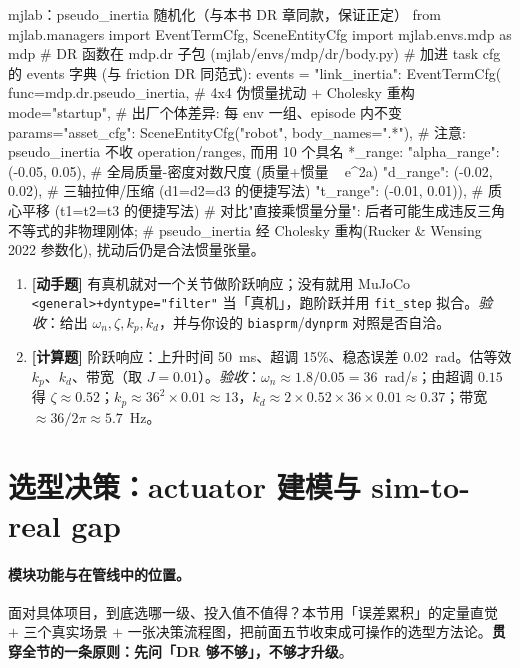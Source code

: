 \begin{codebox}[Python]{mjlab：pseudo\_inertia 随机化（与本书 DR 章同款，保证正定）}
from mjlab.managers import EventTermCfg, SceneEntityCfg
import mjlab.envs.mdp as mdp        # DR 函数在 mdp.dr 子包 (mjlab/envs/mdp/dr/body.py)
# 加进 task cfg 的 events 字典 (与 friction DR 同范式):
events = {
    "link_inertia": EventTermCfg(
        func=mdp.dr.pseudo_inertia,            # 4x4 伪惯量扰动 + Cholesky 重构
        mode="startup",                        # 出厂个体差异: 每 env 一组、episode 内不变
        params={"asset_cfg": SceneEntityCfg("robot", body_names=".*"),
                # 注意: pseudo_inertia 不收 operation/ranges, 而用 10 个具名 *_range:
                "alpha_range": (-0.05, 0.05),  # 全局质量-密度对数尺度 (质量+惯量 ~ e^{2a})
                "d_range": (-0.02, 0.02),      # 三轴拉伸/压缩 (d1=d2=d3 的便捷写法)
                "t_range": (-0.01, 0.01)}),    # 质心平移 (t1=t2=t3 的便捷写法)
}
# 对比"直接乘惯量分量": 后者可能生成违反三角不等式的非物理刚体;
# pseudo_inertia 经 Cholesky 重构(Rucker & Wensing 2022 参数化), 扰动后仍是合法惯量张量。
\end{codebox}

\begin{practice}[本节练习]
\begin{enumerate}
  \item \textbf{[动手题]} 有真机就对一个关节做阶跃响应；没有就用 MuJoCo \verb|<general>+dyntype="filter"| 当「真机」，跑阶跃并用 \verb|fit_step| 拟合。\emph{验收}：给出 $\omega_n,\zeta,k_p,k_d$，并与你设的 \verb|biasprm|/\verb|dynprm| 对照是否自洽。
  \item \textbf{[计算题]} 阶跃响应：上升时间 50~ms、超调 15\%、稳态误差 0.02~rad。估等效 $k_p$、$k_d$、带宽（取 $J=0.01$）。\emph{验收}：$\omega_n\approx1.8/0.05=36$~rad/s；由超调 $0.15$ 得 $\zeta\approx0.52$；$k_p\approx36^2\times0.01\approx13$，$k_d\approx2\times0.52\times36\times0.01\approx0.37$；带宽 $\approx36/2\pi\approx5.7$~Hz。
\end{enumerate}
\end{practice}

\section{选型决策：actuator 建模与 sim-to-real gap}
\label{sec:rlmc-act-decision}

\paragraph{模块功能与在管线中的位置。}面对具体项目，到底选哪一级、投入值不值得？本节用「误差累积」的定量直觉 $+$ 三个真实场景 $+$ 一张决策流程图，把前面五节收束成可操作的选型方法论。\textbf{贯穿全节的一条原则：先问「DR 够不够」，不够才升级}。

